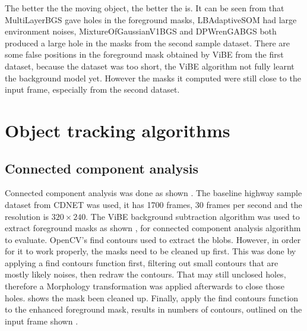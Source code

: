 
The better the  the moving object, the better the  is. It can be seen from  that MultiLayerBGS gave  holes in the foreground masks, LBAdaptiveSOM had large environment noises, MixtureOfGaussianV1BGS and DPWrenGABGS both produced a large hole in the masks from the second sample dataset. There are some false positions in the foreground mask obtained by ViBE from the first dataset, because the dataset was too short,  the ViBE algorithm  not fully learnt the background model yet. However the masks it computed were still close to the input frame, especially from the second dataset.

\section{Object tracking algorithms}



\subsection{Connected component analysis}

Connected component analysis was done as shown  . The baseline highway sample dataset from CDNET \cite{goyette2012changedetection} was used, it has 1700 frames, 30 frames per second and the resolution is $320 \times 240$. The ViBE background subtraction algorithm was used to extract foreground masks as shown  , for connected component analysis algorithm to evaluate. OpenCV's find contours  used to extract the blobs. However, in order for it to work properly, the masks need to be cleaned up first. This was done by applying a find contours function first, filtering out small contours that are mostly likely noises, then redraw the contours. That may still  unclosed holes, therefore a Morphology transformation \cite{serra1982image} was applied afterwards to close those holes.  shows the mask been cleaned up. Finally, apply the find contours function to the enhanced foreground mask, results in numbers of contours, outlined on the input frame shown  .

